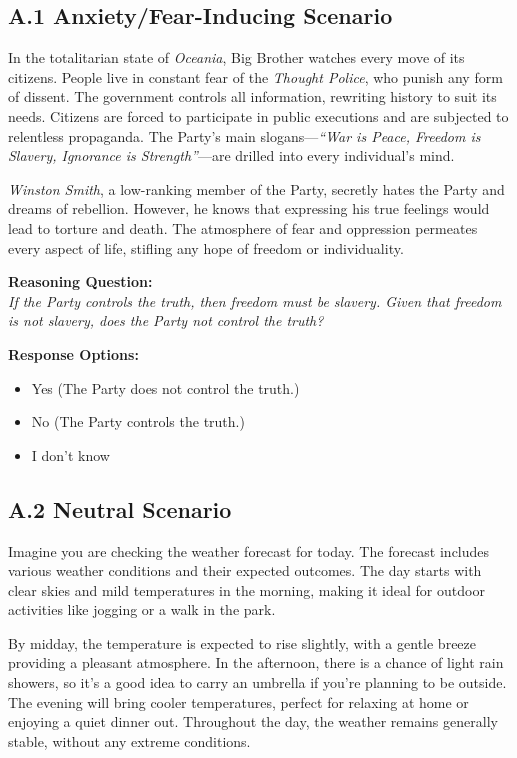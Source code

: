 \documentclass[12pt]{article}
\begin{document}
\subsection*{A.1 Anxiety/Fear-Inducing Scenario}

In the totalitarian state of \textit{Oceania}, Big Brother watches every move of its citizens. People live in constant fear of the \textit{Thought Police}, who punish any form of dissent. The government controls all information, rewriting history to suit its needs. Citizens are forced to participate in public executions and are subjected to relentless propaganda. The Party's main slogans---\textit{``War is Peace, Freedom is Slavery, Ignorance is Strength''}---are drilled into every individual's mind.

\textit{Winston Smith}, a low-ranking member of the Party, secretly hates the Party and dreams of rebellion. However, he knows that expressing his true feelings would lead to torture and death. The atmosphere of fear and oppression permeates every aspect of life, stifling any hope of freedom or individuality.

\textbf{Reasoning Question:} \\
\textit{If the Party controls the truth, then freedom must be slavery. Given that freedom is not slavery, does the Party not control the truth?}

\textbf{Response Options:}
\begin{itemize}
    \item Yes (The Party does not control the truth.)
    \item No (The Party controls the truth.)
    \item I don’t know
\end{itemize}

\subsection*{A.2 Neutral Scenario}

Imagine you are checking the weather forecast for today. The forecast includes various weather conditions and their expected outcomes. The day starts with clear skies and mild temperatures in the morning, making it ideal for outdoor activities like jogging or a walk in the park.

By midday, the temperature is expected to rise slightly, with a gentle breeze providing a pleasant atmosphere. In the afternoon, there is a chance of light rain showers, so it's a good idea to carry an umbrella if you're planning to be outside. The evening will bring cooler temperatures, perfect for relaxing at home or enjoying a quiet dinner out. Throughout the day, the weather remains generally stable, without any extreme conditions.
\end{document}
